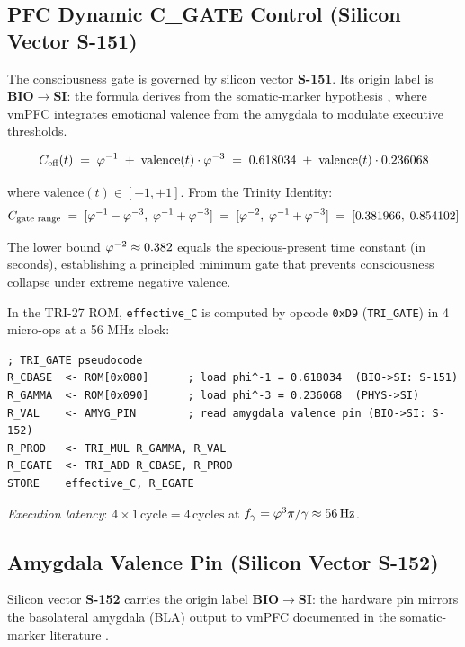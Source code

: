 \subsection{PFC Dynamic C\_GATE Control (Silicon Vector S-151)}
\label{ssec:flos73-cgate}

The consciousness gate is governed by silicon vector \textbf{S-151}.
Its origin label is \textbf{BIO$\to$SI}: the formula derives from the
somatic-marker hypothesis \cite{damasio_1996,bechara_1999}, where vmPFC
integrates emotional valence from the amygdala to modulate executive
thresholds.

\[
  C_{\text{eff}}(t) \;=\; \varphi^{-1} \;+\; \mathrm{valence}(t)\cdot\varphi^{-3}
             \;=\; 0.618034 \;+\; \mathrm{valence}(t)\cdot 0.236068
\]

where $\mathrm{valence}(t) \in [-1, +1]$.  From the Trinity Identity:
\[
  C_{\text{gate range}} \;=\; [\varphi^{-1} - \varphi^{-3},\; \varphi^{-1} + \varphi^{-3}]
                       \;=\; [\varphi^{-2},\; \varphi^{-1} + \varphi^{-3}]
                       \;=\; [0.381966,\; 0.854102]
\]

The lower bound $\varphi^{-2} \approx 0.382$ equals the specious-present time
constant (in seconds), establishing a principled minimum gate that prevents
consciousness collapse under extreme negative valence.

In the TRI-27 ROM, \texttt{effective\_C} is computed by opcode
\texttt{0xD9} (\texttt{TRI\_GATE}) in 4 micro-ops at a 56 MHz clock:

\begin{verbatim}
; TRI_GATE pseudocode
R_CBASE  <- ROM[0x080]      ; load phi^-1 = 0.618034  (BIO->SI: S-151)
R_GAMMA  <- ROM[0x090]      ; load phi^-3 = 0.236068  (PHYS->SI)
R_VAL    <- AMYG_PIN        ; read amygdala valence pin (BIO->SI: S-152)
R_PROD   <- TRI_MUL R_GAMMA, R_VAL
R_EGATE  <- TRI_ADD R_CBASE, R_PROD
STORE    effective_C, R_EGATE
\end{verbatim}

\textit{Execution latency}: $4 \times 1\,\text{cycle} = 4\,\text{cycles}$ at
$f_\gamma = \varphi^{3}\pi/\gamma \approx 56\,\text{Hz}$.

\subsection{Amygdala Valence Pin (Silicon Vector S-152)}
\label{ssec:flos73-valpin}

Silicon vector \textbf{S-152} carries the origin label \textbf{BIO$\to$SI}:
the hardware pin mirrors the basolateral amygdala (BLA) output to vmPFC
documented in the somatic-marker literature \cite{bechara_1999}.

